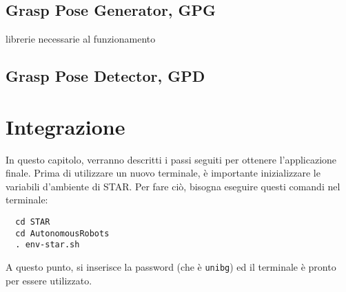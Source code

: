 \documentclass{report}
\begin{document}
\section{Grasp Pose Generator, GPG}\label{GPG}
librerie necessarie al funzionamento
\section{Grasp Pose Detector, GPD}\label{GPD}

\newpage
\chapter{Integrazione}\label{integrazione}
In questo capitolo, verranno descritti i passi seguiti per ottenere l'applicazione finale. Prima di utilizzare un nuovo terminale, è importante inizializzare le variabili d'ambiente di STAR. Per fare ciò, bisogna eseguire questi comandi nel terminale:
\begin{verbatim}
  cd STAR
  cd AutonomousRobots
  . env-star.sh
\end{verbatim}
A questo punto, si inserisce la password (che è \texttt{unibg}) ed il terminale è pronto per essere utilizzato. 
\end{document}
